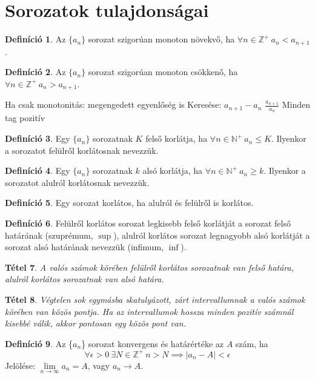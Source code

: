 \documentclass[twoside,12pt]{report}
\newtheorem{theorem}{Tétel}[section]
\theoremstyle{definition}
\newtheorem{definition}[theorem]{Definíció}
\begin{document}
\section{Sorozatok tulajdonságai}
	\begin{definition}
		Az $\{a_n\}$ sorozat szigorúan monoton növekvő, ha $\forall n\in\mathbb{Z}^+\ a_n<a_{n+1}$.
	\end{definition}
	\begin{definition}
		Az $\{a_n\}$ sorozat szigorúan monoton csökkenő, ha $\forall n\in\mathbb{Z}^+\ a_n>a_{n+1}$.
	\end{definition}
	\begin{outline}
		\1 Ha csak monotonitás: megengedett egyenlőség is
		\1 Keresése:
			\2 $a_{n+1}-a_n$
			\2 $\frac{a_{n+1}}{a_n}$
				\3 Minden tag pozitív
	\end{outline}
	\begin{definition}
		Egy $\{a_n\}$ sorozatnak $K$ felső korlátja, ha $\forall n\in\mathbb{N}^+\ a_n\le K$. Ilyenkor a sorozatot felülről korlátosnak nevezzük.
	\end{definition}
	\begin{definition}
		Egy $\{a_n\}$ sorozatnak $k$ alsó korlátja, ha $\forall n\in\mathbb{N}^+\ a_n\ge k$. Ilyenkor a sorozatot alulról korlátosnak nevezzük.
	\end{definition}
	\begin{definition}
		Egy sorozat korlátos, ha alulról és felülről is korlátos.
	\end{definition}
	\begin{definition}
		Felülről korlátos sorozat legkisebb felső korlátját a sorozat felső határának (szuprémum, $\sup$), alulról korlátos sorozat legnagyobb alsó korlátját a sorozat alsó határának nevezzük (infimum, $\inf$).
	\end{definition}
	\begin{theorem}
		A valós számok körében felülről korlátos sorozatnak van felső határa, alulról korlátos sorozatnak van alsó határa.
	\end{theorem}
	\begin{theorem}
		Végtelen sok egymásba skatulyázott, zárt intervallumnak a valós számok körében van közös pontja. Ha az intervallumok hossza minden pozitív számnál kisebbé válik, akkor pontosan egy közös pont van.
	\end{theorem}
	\begin{definition}
		Az \{$a_n$\} sorozat konvergens és határértéke az $A$ szám, ha
		\begin{equation*}
			\forall\epsilon>0\ \exists N\in\mathbb{Z}^+\ n>N\implies|a_n-A|<\epsilon
		\end{equation*}
		Jelölése: $\lim\limits_{n\rightarrow\infty}a_n=A$, vagy $a_n\rightarrow A$.
	\end{definition}
\end{document}
